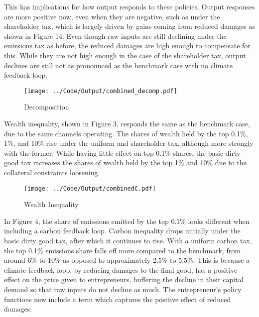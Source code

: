 \documentclass[12pt,a4paper]{article}
\begin{document}
\hspace*{6mm} This has implications for how output responds to these policies. Output responses are more positive now, even when they are negative, such as under the shareholder tax, which is largely driven by gains coming from reduced damages as shown in Figure 14. Even though raw inputs are still declining under the emissions tax as before, the reduced damages are high enough to compensate for this. While they are not high enough in the case of the shareholder tax, output declines are still not as pronounced as the benchmark case with no climate feedback loop. 

\begin{figure}[h! ]
    \centering
    \caption{Decomposition}
\texttt{[image: ../Code/Output/combined\_decomp.pdf]}  
 
\end{figure}



\hspace*{6mm} Wealth inequality, shown in Figure 3, responds the same as the benchmark case, due to the same channels operating. The shares of wealth held by the top 0.1\%, 1\%, and 10\% rise under the uniform and shareholder tax, although more strongly with the former. While having little effect on top 0.1\% shares, the basic dirty good tax increases the shares of wealth held by the top 1\% and 10\% due to the collateral constraints loosening. 


\begin{figure}[h]
    \centering
    \caption{Wealth Inequality }   
\texttt{[image: ../Code/Output/combinedC.pdf]} 
\end{figure}

\hspace*{6mm} In Figure 4, the share of emissions emitted by the top 0.1\% looks different when including a carbon feedback loop. Carbon inequality drops initially under the basic dirty good tax, after which it continues to rise. With a uniform carbon tax, the top 0.1\% emissions share falls off more compared to the benchmark, from around 6\% to 10\% as opposed to approximately 2.5\% to 5.5\%. This is because a climate feedback loop, by reducing damages to the final good, has a positive effect on the price given to entrepreneurs, buffering the decline in their capital demand so that raw inputs do not decline as much. The entrepreneur's policy functions now include  a term which captures the positive effect of reduced damages:
\end{document}
